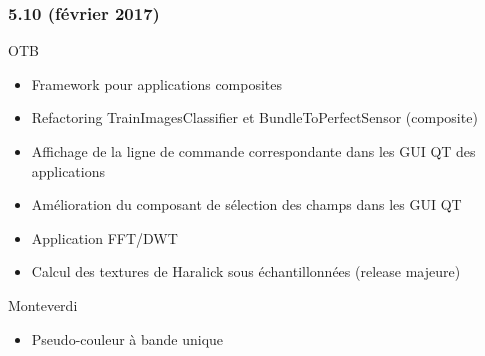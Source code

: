 \begin{frame}
  \frametitle{5.10 (février 2017)}
  \begin{block}{OTB}
    \begin{itemize}
      \item Framework pour applications composites
      \item Refactoring TrainImagesClassifier et BundleToPerfectSensor (composite)
      \item Affichage de la ligne de commande correspondante dans les GUI QT des applications
      \item Amélioration du composant de sélection des champs dans les GUI QT
      \item Application FFT/DWT
      \item Calcul des textures de Haralick sous échantillonnées (release majeure)
    \end{itemize}
  \end{block}
  
  \begin{block}{Monteverdi}
    \begin{itemize}
      \item Pseudo-couleur à bande unique
      \end{itemize}
  \end{block}
      
\end{frame}

